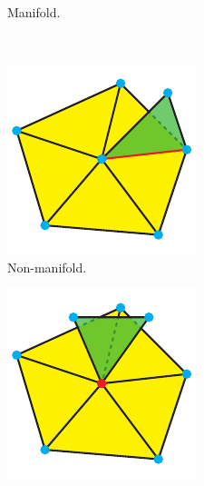 \begin{description}
\begin{figure}[H]
\begin{subfigure}[b]{0.3\textwidth}
			\caption{
				Manifold.
			}
			\label{fig:open_fan}
		\end{subfigure}
		\\
		\begin{subfigure}[t]{0.32\textwidth}
			\centering
			\includegraphics[width=\textwidth]{images/non_manifold_edge}
			\caption{
				Non-manifold.
			}
			\label{fig:non_manifold_edge}
		\end{subfigure}
		\begin{subfigure}[t]{0.32\textwidth}
			\centering
			\includegraphics[width=\textwidth]{images/non_manifold_vertex}

\end{subfigure}
\end{figure}
\end{description}
